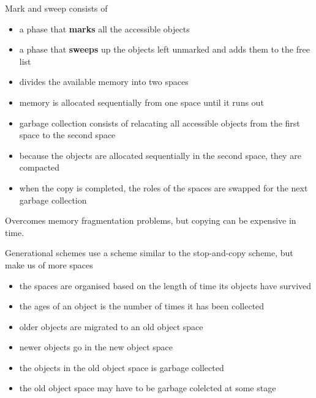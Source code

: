 Mark and sweep consists of
\begin{itemize}
    \item a phase that \textbf{marks} all the accessible objects
    \item a phase that \textbf{sweeps} up the objects left unmarked and adds them to the 
    free list
\end{itemize}

\begin{itemize}
    \item divides the available memory into two spaces
    \item memory is allocated sequentially from one space until it runs out
    \item garbage collection consists of relacating all accessible objects from the first 
    space to the second space
    \item because the objects are allocated sequentially in the second space, they are 
    compacted
    \item when the copy is completed, the roles of the spaces are swapped for the next 
    garbage collection
\end{itemize}
Overcomes memory fragmentation problems, but copying can be expensive in time.

Generational schemes use a scheme similar to the stop-and-copy scheme, but make us of more 
spaces
\begin{itemize}
    \item the spaces are organised based on the length of time its objects have survived
    \item the ages of an object is the number of times it has been collected
    \item older objects are migrated to an old object space
    \item newer objects go in the new object space
    \item the objects in the old object space is garbage collected
    \item the old object space may have to be garbage colelcted at some stage
\end{itemize}

